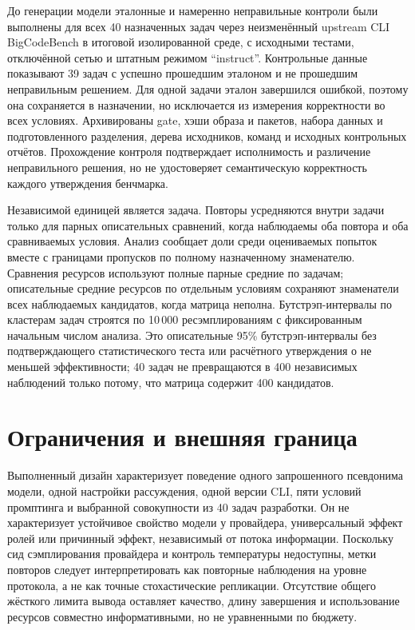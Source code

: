 До генерации модели эталонные и намеренно неправильные контроли были выполнены для всех 40 назначенных задач через неизменённый upstream CLI BigCodeBench в итоговой изолированной среде, с исходными тестами, отключённой сетью и штатным режимом ``instruct''. Контрольные данные показывают 39 задач с успешно прошедшим эталоном и не прошедшим неправильным решением. Для одной задачи эталон завершился ошибкой, поэтому она сохраняется в назначении, но исключается из измерения корректности во всех условиях. Архивированы gate, хэши образа и пакетов, набора данных и подготовленного разделения, дерева исходников, команд и исходных контрольных отчётов. Прохождение контроля подтверждает исполнимость и различение неправильного решения, но не удостоверяет семантическую корректность каждого утверждения бенчмарка.

Независимой единицей является задача. Повторы усредняются внутри задачи только для парных описательных сравнений, когда наблюдаемы оба повтора и оба сравниваемых условия. Анализ сообщает доли среди оцениваемых попыток вместе с границами пропусков по полному назначенному знаменателю. Сравнения ресурсов используют полные парные средние по задачам; описательные средние ресурсов по отдельным условиям сохраняют знаменатели всех наблюдаемых кандидатов, когда матрица неполна. Бутстрэп-интервалы по кластерам задач строятся по 10\,000 ресэмплированиям с фиксированным начальным числом анализа. Это описательные 95\% бутстрэп-интервалы без подтверждающего статистического теста или расчётного утверждения о не меньшей эффективности; 40 задач не превращаются в 400 независимых наблюдений только потому, что матрица содержит 400 кандидатов.

\section{Ограничения и внешняя граница}
\label{sec:dev40-limits}

Выполненный дизайн характеризует поведение одного запрошенного псевдонима модели, одной настройки рассуждения, одной версии CLI, пяти условий промптинга и выбранной совокупности из 40 задач разработки. Он не характеризует устойчивое свойство модели у провайдера, универсальный эффект ролей или причинный эффект, независимый от потока информации. Поскольку сид сэмплирования провайдера и контроль температуры недоступны, метки повторов следует интерпретировать как повторные наблюдения на уровне протокола, а не как точные стохастические репликации. Отсутствие общего жёсткого лимита вывода оставляет качество, длину завершения и использование ресурсов совместно информативными, но не уравненными по бюджету.

